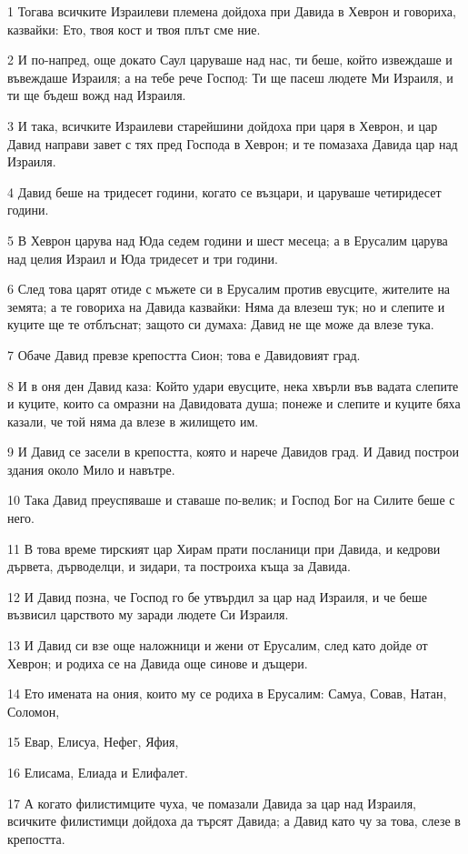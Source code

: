 \par 1 Тогава всичките Израилеви племена дойдоха при Давида в Хеврон и говориха, казвайки: Ето, твоя кост и твоя плът сме ние.
\par 2 И по-напред, още докато Саул царуваше над нас, ти беше, който извеждаше и въвеждаше Израиля; а на тебе рече Господ: Ти ще пасеш людете Ми Израиля, и ти ще бъдеш вожд над Израиля.
\par 3 И така, всичките Израилеви старейшини дойдоха при царя в Хеврон, и цар Давид направи завет с тях пред Господа в Хеврон; и те помазаха Давида цар над Израиля.
\par 4 Давид беше на тридесет години, когато се възцари, и царуваше четиридесет години.
\par 5 В Хеврон царува над Юда седем години и шест месеца; а в Ерусалим царува над целия Израил и Юда тридесет и три години.
\par 6 След това царят отиде с мъжете си в Ерусалим против евусците, жителите на земята; а те говориха на Давида казвайки: Няма да влезеш тук; но и слепите и куците ще те отблъснат; защото си думаха: Давид не ще може да влезе тука.
\par 7 Обаче Давид превзе крепостта Сион; това е Давидовият град.
\par 8 И в оня ден Давид каза: Който удари евусците, нека хвърли във вадата слепите и куците, които са омразни на Давидовата душа; понеже и слепите и куците бяха казали, че той няма да влезе в жилището им.
\par 9 И Давид се засели в крепостта, която и нарече Давидов град. И Давид построи здания около Мило и навътре.
\par 10 Така Давид преуспяваше и ставаше по-велик; и Господ Бог на Силите беше с него.
\par 11 В това време тирският цар Хирам прати посланици при Давида, и кедрови дървета, дърводелци, и зидари, та построиха къща за Давида.
\par 12 И Давид позна, че Господ го бе утвърдил за цар над Израиля, и че беше възвисил царството му заради людете Си Израиля.
\par 13 И Давид си взе още наложници и жени от Ерусалим, след като дойде от Хеврон; и родиха се на Давида още синове и дъщери.
\par 14 Ето имената на ония, които му се родиха в Ерусалим: Самуа, Совав, Натан, Соломон,
\par 15 Евар, Елисуа, Нефег, Яфия,
\par 16 Елисама, Елиада и Елифалет.
\par 17 А когато филистимците чуха, че помазали Давида за цар над Израиля, всичките филистимци дойдоха да търсят Давида; а Давид като чу за това, слезе в крепостта.

